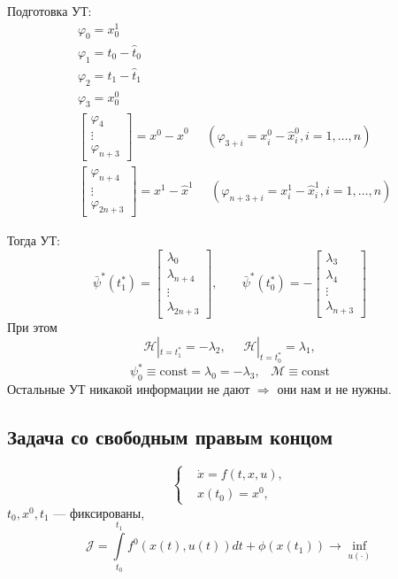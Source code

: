 \documentclass[12pt, a4paper]{article}
\theoremstyle{rusdef}
\renewcommand{\H}{\mathcal{H}} %
\newcommand{\M}{\mathcal{M}} %
\DeclareMathOperator*{\thus}{\Rightarrow} %
\begin{document}
Подготовка УТ:
$$
\begin{aligned}
& \varphi_0 = x^1_0\\
& \varphi_1 = t_0 - \hat{t}_0\\
& \varphi_2 = t_1 - \hat{t}_1\\
& \varphi_3 = x^0_0\\
& \left[ \begin{matrix}\varphi_4 \\ \vdots \\ \varphi_{n+3} \end{matrix} \right] = x^0 - \hat{x}^0 \;\;\;\;\; (\varphi_{3+i} = x^0_i - \hat{x}^0_i, i = 1, \ldots, n)\\
& \left[ \begin{matrix}\varphi_{n+4} \\ \vdots \\ \varphi_{2n+3} \end{matrix} \right] = x^1 - \hat{x}^1 \;\;\;\;\; (\varphi_{n+3+i} = x^1_i - \hat{x}^1_i, i = 1, \ldots, n)
\end{aligned}
$$

Тогда УТ:
$$
\bar{\psi}^*(t^*_1) = \left[ \begin{matrix}
\lambda_0 \\ \lambda_{n+4} \\ \vdots \\ \lambda_{2n+3}
\end{matrix} \right], 
\;\;\;\;\;\;\;
\bar{\psi}^*(t^*_0) = - \left[ \begin{matrix}
\lambda_3 \\ \lambda_{4} \\ \vdots \\ \lambda_{n+3}
\end{matrix} \right]
$$
При этом
$$
\H |_{t=t^*_1} = -\lambda_2, \;\;\;\;\; \H |_{t = t^*_0} = \lambda_1,
$$
$$
\psi^*_0 \equiv \mathrm{const} = \lambda_0 = -\lambda_3, \;\;\; \M \equiv \mathrm{const}
$$
Остальные УТ никакой информации не дают $\thus$ они нам и не нужны.

\subsection*{Задача со свободным правым концом}
$$
\left\{
\begin{aligned}
& \dot{x} = f(t, x, u), \\
& x(t_0) = x^0,
\end{aligned}
\right.
$$
$t_0, x^0, t_1$ --- фиксированы,
$$
\mathcal{J} = \int\limits_{t_0}^{t_1} f^0(x(t), u(t)) dt + \phi(x(t_1)) \to \inf\limits_{u(\cdot)}
$$
\end{document}
